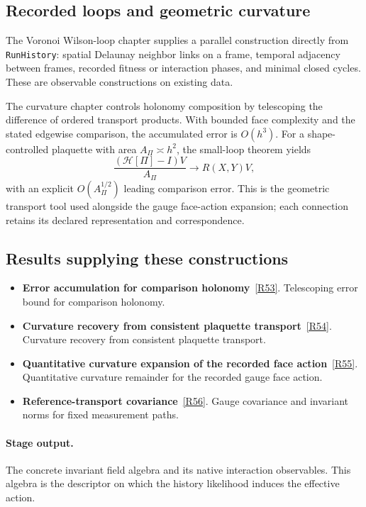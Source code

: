 \documentclass[11pt,a4paper]{article}
\begin{document}
\subsection*{Recorded loops and geometric curvature}
The Voronoi Wilson-loop chapter supplies a parallel construction directly from \texttt{RunHistory}: spatial Delaunay neighbor links on a frame, temporal adjacency between frames, recorded fitness or interaction phases, and minimal closed cycles. These are observable constructions on existing data.

The curvature chapter controls holonomy composition by telescoping the difference of ordered transport products. With bounded face complexity and the stated edgewise comparison, the accumulated error is \(O(h^3)\). For a shape-controlled plaquette with area \(A_\Pi\asymp h^2\), the small-loop theorem yields
\[
\frac{(\mathcal H[\Pi]-I)V}{A_\Pi}
\longrightarrow R(X,Y)V,
\]
with an explicit \(O(A_\Pi^{1/2})\) leading comparison error. This is the geometric transport tool used alongside the gauge face-action expansion; each connection retains its declared representation and correspondence.
\subsection*{Results supplying these constructions}
\begin{itemize}
\item \textbf{Error accumulation for comparison holonomy}~\hyperref[src:lem-regge-holonomy-approx]{[R53]}. Telescoping error bound for comparison holonomy.
\item \textbf{Curvature recovery from consistent plaquette transport}~\hyperref[src:thm-riemann-scutoid]{[R54]}. Curvature recovery from consistent plaquette transport.
\item \textbf{Quantitative curvature expansion of the recorded face action}~\hyperref[src:lem-ym-recorded-face-action-remainder]{[R55]}. Quantitative curvature remainder for the recorded gauge face action.
\item \textbf{Reference-transport covariance}~\hyperref[src:lem-reference-transport-covariance]{[R56]}. Gauge covariance and invariant norms for fixed measurement paths.
\end{itemize}
\paragraph{Stage output.} The concrete invariant field algebra and its native interaction observables. This algebra is the descriptor on which the history likelihood induces the effective action.
\end{document}
